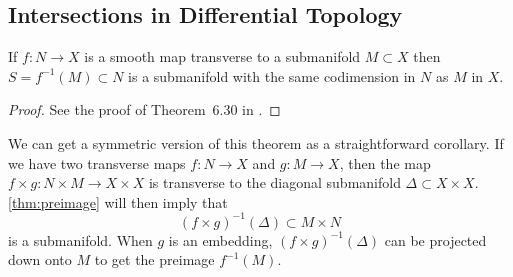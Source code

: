 
\subsection{Intersections in Differential Topology}\label{sec:differential-topology-intersections}

\begin{theorem}\label{thm:preimage}
	If $f : N \to X$ is a smooth map transverse to a submanifold $M\subset X$ then $S=f^{-1}(M)\subset N$ is a submanifold with the same codimension in $N$ as $M$ in $X$.
\end{theorem}
\begin{proof}
	See the proof of Theorem~6.30 in \cite{lee2013smooth}.
\end{proof}

\begin{remark}\label{rmk:symmetric-preimage-theorem}
	We can get a symmetric version of this theorem as a straightforward corollary. If we have two transverse maps $f : N\to X$ and $g : M\to X$, then the map $f\times g : N\times M \to X\times X$ is transverse to the diagonal submanifold $\Delta\subset X\times X$. \cref{thm:preimage} will then imply that
	\[
		(f\times g)^{-1}(\Delta) \subset M\times N
	\]
	is a submanifold. When $g$ is an embedding, $(f\times g)^{-1}(\Delta)$ can be projected down onto $M$ to get the preimage $f^{-1}(M)$.
\end{remark}

